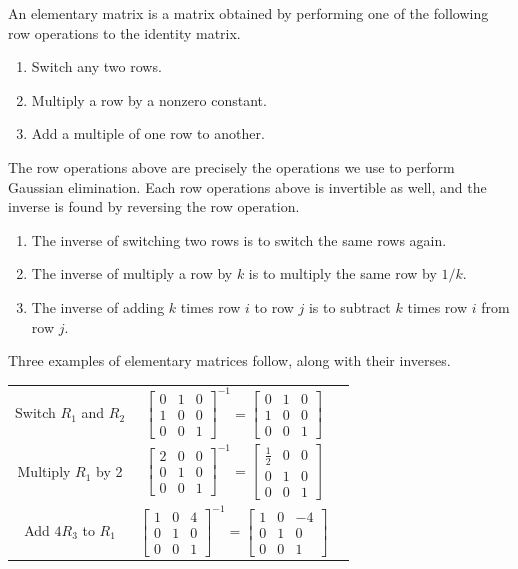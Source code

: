 \begin{definition}
An elementary matrix is a matrix obtained by performing one of the following row operations to the identity matrix.
\begin{enumerate}
	\item Switch any two rows.
	\item Multiply a row by a nonzero constant.
	\item Add a multiple of one row to another.
\end{enumerate}
\end{definition}
The row operations above are precisely the operations we use to perform Gaussian elimination. 
Each row operations above is invertible as well, and the inverse is found by reversing the row operation.  
\begin{enumerate}
	\item The inverse of switching two rows is to switch the same rows again.  
	\item The inverse of multiply a row by $k$ is to multiply the same row by $1/k$.  
	\item The inverse of adding $k$ times row $i$ to row $j$ is to subtract $k$ times row $i$ from row $j$. 
\end{enumerate}
Three examples of elementary matrices follow, along with their inverses.
\begin{center}
\begin{tabular}{ccc}
Switch $R_1$ and $R_2$
&
$\begin{bmatrix}
0&1&0\\
1&0&0\\
0&0&1
\end{bmatrix}^{-1} = 
\begin{bmatrix}
0&1&0\\
1&0&0\\
0&0&1
\end{bmatrix}$
\\
Multiply $R_1$ by 2
&
$\begin{bmatrix}
2&0&0\\
0&1&0\\
0&0&1
\end{bmatrix}^{-1}=
\begin{bmatrix}
\frac{1}{2}&0&0\\
0&1&0\\
0&0&1
\end{bmatrix}
$
\\
Add $4R_3$ to $R_1$
&
$\begin{bmatrix}
1&0&4\\
0&1&0\\
0&0&1
\end{bmatrix}^{-1}=
\begin{bmatrix}
1&0&-4\\
0&1&0\\
0&0&1
\end{bmatrix}
$
\end{tabular}
\end{center}
